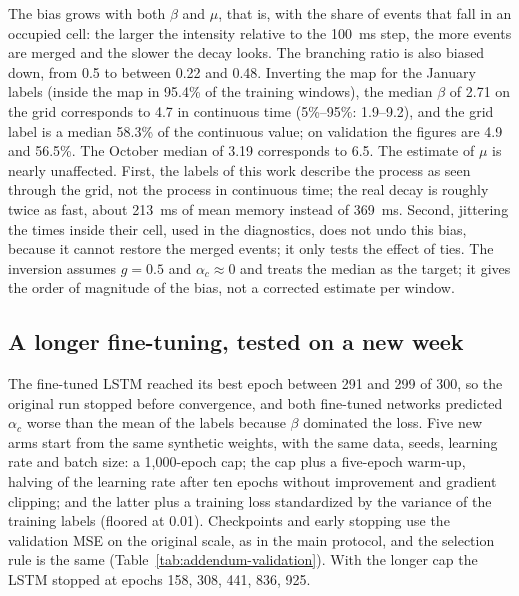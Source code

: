 The bias grows with both $\beta$ and $\mu$, that is, with the share of events that fall in
an occupied cell: the larger the intensity relative to the 100~ms step, the more events are
merged and the slower the decay looks. The branching ratio is also biased down, from 0.5 to
between 0.22 and 0.48. Inverting the map for the January labels (inside the map in
95.4\% of the training windows), the median $\beta$ of
2.71 on the grid corresponds to
4.7 in continuous time (5\%--95\%:
1.9--9.2),
and the grid label is a median 58.3\% of the
continuous value; on validation the figures are 4.9
and 56.5\%. The October median of
3.19 corresponds to 6.5. The
estimate of $\mu$ is nearly unaffected. First, the labels of this
work describe the process as seen through the grid, not the process in continuous time; the
real decay is roughly twice as fast, about
213~ms of mean memory instead of
369~ms. Second,
jittering the times inside their cell, used in the diagnostics, does not undo this bias,
because it cannot restore the merged events; it only tests the effect of ties. The inversion
assumes $g=0.5$ and $\alpha_c\approx0$ and treats the median as the target; it gives the
order of magnitude of the bias, not a corrected estimate per window.


\subsection{A longer fine-tuning, tested on a new week}
\label{sec:addendum-recipe}

The fine-tuned LSTM reached its best epoch between 291 and 299 of 300, so the original run
stopped before convergence, and both fine-tuned networks predicted $\alpha_c$ worse than the
mean of the labels because $\beta$ dominated the loss. Five new arms start from the same
synthetic weights, with the same data, seeds, learning rate and batch size: a 1,000-epoch
cap; the cap plus a five-epoch warm-up, halving of the learning rate after ten epochs without
improvement and gradient clipping; and the latter plus a training loss standardized by the
variance of the training labels (floored at 0.01). Checkpoints and early stopping use the
validation MSE on the original scale, as in the main protocol, and the selection rule is the
same (Table~\ref{tab:addendum-validation}). With the longer cap the LSTM stopped at epochs
158, 308, 441, 836, 925.

